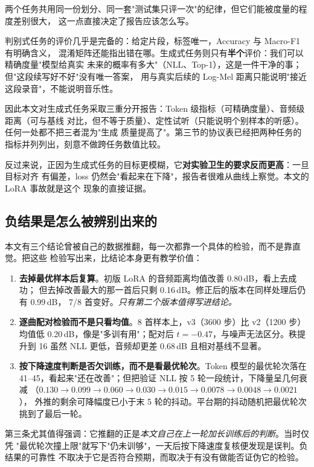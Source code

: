 \documentclass[UTF8,10pt,a4paper]{ctexart}
\begin{document}
两个任务共用同一份划分、同一套"测试集只评一次"的纪律，但它们能被度量的程度差别很大，
这一点直接决定了报告应该怎么写。

判别式任务的评价几乎是完备的：给定片段，标签唯一，Accuracy 与 Macro-F1 有明确含义，
混淆矩阵还能指出错在哪。生成式任务则只有\textbf{半个}评价：我们可以精确度量"模型给真实
未来的概率有多大"（NLL、Top-1），这是一件干净的事；但"这段续写好不好"没有唯一答案，
用与真实后续的 Log-Mel 距离只能说明"接近这段录音"，不能说明音乐性。

因此本文对生成式任务采取三重分开报告：Token 级指标（可精确度量）、音频级距离（可与基线
对比，但不等于质量）、定性试听（只能说明个别样本的听感）。任何一处都不把三者混为"生成
质量提高了"。第三节的协议表已经把两种任务的指标并列列出，刻意不做跨任务数值比较。

反过来说，正因为生成式任务的目标更模糊，它\textbf{对实验卫生的要求反而更高}：一旦目标对齐
有偏差，loss 仍然会"看起来在下降"，报告者很难从曲线上察觉。本文的 LoRA 事故就是这个
现象的直接证据。

\subsection{负结果是怎么被辨别出来的}\label{sec:negresult}

本文有三个结论曾被自己的数据推翻，每一次都靠一个具体的检验，而不是靠直觉。把这些
检验写出来，比结论本身更有教学价值：

\begin{enumerate}
  \item \textbf{去掉最优样本后复算}。初版 LoRA 的音频距离均值改善 0.80\,dB，看上去成功；
        但去掉改善最大的那一首后只剩 0.16\,dB。修正后的版本在同样处理后仍有 0.99\,dB，
        7/8 首变好。\emph{只有第二个版本值得写进结论。}
  \item \textbf{逐曲配对检验而不是只看均值}。8 首样本上，v3（3600 步）比 v2（1200 步）
        均值低 0.20\,dB，像是"多训有用"；配对后 $t=-0.47$，与噪声无法区分。秩提升到 16
        虽然 NLL 更低，音频却更差 0.68\,dB 且相对基线不显著。
  \item \textbf{按下降速度判断是否欠训练，而不是看最优轮次}。Token 模型的最优轮次落在
        41--45，看起来"还在改善"；但把验证 NLL 按 5 轮一段统计，下降量呈几何衰减
        （$0.130\to0.099\to0.060\to0.030\to0.015\to0.0078\to0.0048\to0.0021$），
        外推的剩余可降幅度已小于末 5 轮的抖动。平台期的抖动随机把最优轮次挑到了最后一轮。
\end{enumerate}

第三条尤其值得强调：它推翻的正是\emph{本文自己在上一轮加长训练后的判断}。当时仅凭
"最优轮次撞上限"就写下"仍未训够"，一天后按下降速度复核便发现是误判。负结果的可靠性
不取决于它是否符合预期，而取决于有没有做能否证伪它的检验。
\end{document}

